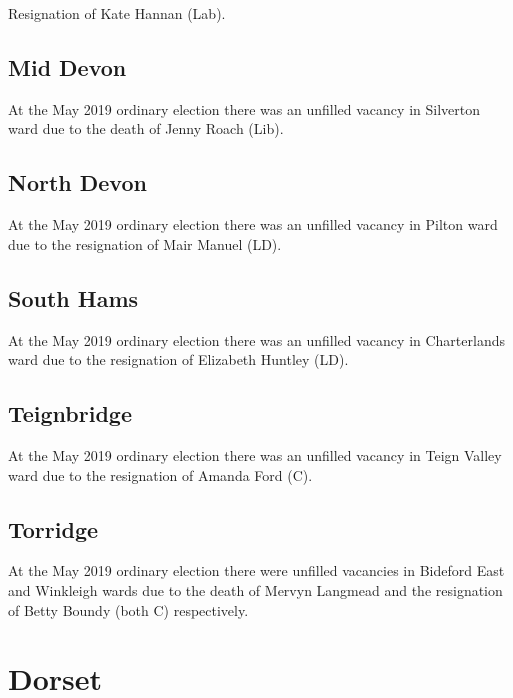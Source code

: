 \documentclass[a4paper,openany]{book}
\begin{document}
\begin{resultsiii}

Resignation of Kate Hannan (Lab).

\subsection*{Mid Devon}

At the May 2019 ordinary election there was an unfilled vacancy in Silverton ward due to the death of Jenny Roach (Lib).

\subsection*{North Devon}

At the May 2019 ordinary election there was an unfilled vacancy in Pilton ward due to the resignation of Mair Manuel (LD).

\subsection*{South Hams}

At the May 2019 ordinary election there was an unfilled vacancy in Charterlands ward due to the resignation of Elizabeth Huntley (LD).

\subsection*{Teignbridge}

At the May 2019 ordinary election there was an unfilled vacancy in Teign Valley ward due to the resignation of Amanda Ford (C).

\subsection*{Torridge}

At the May 2019 ordinary election there were unfilled vacancies in Bideford East and Winkleigh wards due to the death of Mervyn Langmead and the resignation of Betty Boundy (both C) respectively.

\section{Dorset}


\end{resultsiii}
\end{document}
